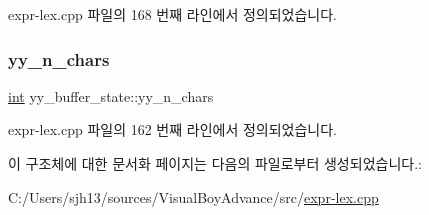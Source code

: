 expr-\/lex.\+cpp 파일의 168 번째 라인에서 정의되었습니다.

\mbox{\label{structyy__buffer__state_a06406208824817acfec2183b79080945}} 
\subsubsection{\texorpdfstring{yy\+\_\+n\+\_\+chars}{yy\_n\_chars}}
{\footnotesize\ttfamily \mbox{\hyperlink{_util_8cpp_a0ef32aa8672df19503a49fab2d0c8071}{int}} yy\+\_\+buffer\+\_\+state\+::yy\+\_\+n\+\_\+chars}



expr-\/lex.\+cpp 파일의 162 번째 라인에서 정의되었습니다.



이 구조체에 대한 문서화 페이지는 다음의 파일로부터 생성되었습니다.\+:\begin{DoxyCompactItemize}
\item 
C\+:/\+Users/sjh13/sources/\+Visual\+Boy\+Advance/src/\mbox{\hyperlink{expr-lex_8cpp}{expr-\/lex.\+cpp}}\end{DoxyCompactItemize}
